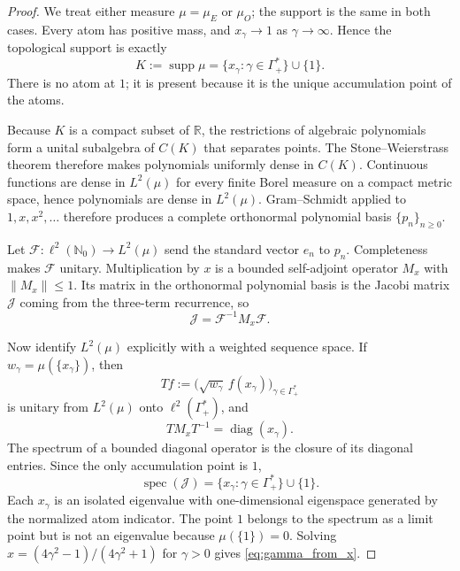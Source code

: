 \documentclass[preprint,12pt]{elsarticle}
\numberwithin{equation}{section}
\theoremstyle{plain}
\theoremstyle{definition}
\theoremstyle{remark}
\begin{document}
\begin{proof}
We treat either measure $\mu=\mu_E$ or $\mu_O$; the support is the same in both cases.  Every atom has positive mass, and
$x_\gamma\to1$ as $\gamma\to\infty$.  Hence the topological support is exactly
\begin{equation}
K:=\operatorname{supp}\mu
=\{x_\gamma:\gamma\in\Gamma_+^*\}\cup\{1\}.
\label{eq:measure_support_exact}
\end{equation}
There is no atom at $1$; it is present because it is the unique accumulation point of the atoms.

Because $K$ is a compact subset of $\mathbb R$, the restrictions of algebraic polynomials form a unital subalgebra of $C(K)$ that separates points.  The Stone--Weierstrass theorem therefore makes polynomials uniformly dense in $C(K)$.  Continuous functions are dense in $L^2(\mu)$ for every finite Borel measure on a compact metric space, hence polynomials are dense in $L^2(\mu)$.  Gram--Schmidt applied to $1,x,x^2,\ldots$ therefore produces a complete orthonormal polynomial basis $\{p_n\}_{n\ge0}$.

Let $\mathcal F:\ell^2(\mathbb N_0)\to L^2(\mu)$ send the standard vector $e_n$ to $p_n$.  Completeness makes $\mathcal F$ unitary.  Multiplication by $x$ is a bounded self-adjoint operator $M_x$ with $\|M_x\|\le1$.  Its matrix in the orthonormal polynomial basis is the Jacobi matrix $\mathcal J$ coming from the three-term recurrence, so
\begin{equation}
\mathcal J=\mathcal F^{-1}M_x\mathcal F.
\label{eq:Jacobi_multiplication_equivalence}
\end{equation}

Now identify $L^2(\mu)$ explicitly with a weighted sequence space.  If $w_\gamma=\mu(\{x_\gamma\})$, then
\begin{equation}
Tf:=\bigl(\sqrt{w_\gamma}\,f(x_\gamma)\bigr)_{\gamma\in\Gamma_+^*}
\end{equation}
is unitary from $L^2(\mu)$ onto $\ell^2(\Gamma_+^*)$, and
\begin{equation}
TM_xT^{-1}=\operatorname{diag}(x_\gamma).
\end{equation}
The spectrum of a bounded diagonal operator is the closure of its diagonal entries.  Since the only accumulation point is $1$,
\begin{equation}
\operatorname{spec}(\mathcal J)=\{x_\gamma:\gamma\in\Gamma_+^*\}\cup\{1\}.
\end{equation}
Each $x_\gamma$ is an isolated eigenvalue with one-dimensional eigenspace generated by the normalized atom indicator.  The point $1$ belongs to the spectrum as a limit point but is not an eigenvalue because $\mu(\{1\})=0$.  Solving
$x=(4\gamma^2-1)/(4\gamma^2+1)$ for $\gamma>0$ gives \eqref{eq:gamma_from_x}.


\end{proof}
\end{document}
